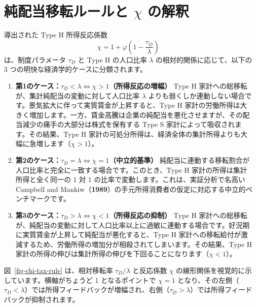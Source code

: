\documentclass[
  japanese,
  lualatex,
  ja=standard,
  12pt,
  a4paper]{ltjsarticle}
\providecommand{\tightlist}{%
  \setlength{\itemsep}{0pt}\setlength{\parskip}{0pt}}
\begin{document}

\section{\texorpdfstring{純配当移転ルールと \(\chi\)
の解釈}{純配当移転ルールと \textbackslash chi の解釈}}\label{ux7d14ux914dux5f53ux79fbux8ee2ux30ebux30fcux30ebux3068-chi-ux306eux89e3ux91c8}

導出された Type H 所得反応係数 \[
\chi = 1 + \varphi\left( 1 - \frac{\tau_D}{\lambda} \right)
\] は、制度パラメータ \(\tau_D\) と Type H の人口比率 \(\lambda\)
の相対的関係に応じて、以下の 3 つの明快な経済学的ケースに分類されます。

\begin{enumerate}
\def\labelenumi{\arabic{enumi}.}
\tightlist
\item
  \textbf{第1のケース：\(\tau_D < \lambda \iff \chi > 1\)（所得反応の増幅）}
  Type H 家計への総移転が、集計純配当の変動に対して人口比率 \(\lambda\)
  よりも弱くしか連動しない場合です。景気拡大に伴って実質賃金が上昇すると、Type
  H
  家計の労働所得は大きく増加します。一方、賃金高騰は企業の純配当を悪化させますが、その配当減少の痛手の大部分は株式を保有する
  Type S 家計によって吸収されます。その結果、Type H
  家計の可処分所得は、経済全体の集計所得よりも大幅に急増します（\(\chi > 1\)）。
\item
  \textbf{第2のケース：\(\tau_D = \lambda \iff \chi = 1\)（中立的基準）}
  純配当に連動する移転割合が人口比率と完全に一致する場合です。このとき、Type
  H 家計の所得は集計所得と全く同一の 1 対 1
  の比率で変動します。これは、実証分析で名高い Campbell and
  Mankiw（\textbf{1989}）の手元所得消費者の仮定に対応する中立的ベンチマークです。
\item
  \textbf{第3のケース：\(\tau_D > \lambda \iff \chi < 1\)（所得反応の抑制）}
  Type H
  家計への総移転が、純配当の変動に対して人口比率以上に過敏に連動する場合です。好況期に実質賃金が上昇して純配当が悪化すると、Type
  H
  家計への移転給付が激減するため、労働所得の増加分が相殺されてしまいます。その結果、Type
  H
  家計の所得の伸びは集計所得の伸びを下回ることになります（\(\chi < 1\)）。
\end{enumerate}


図~\ref{fig-chi-tax-rule} は、相対移転率 \(\tau_D/\lambda\) と反応係数
\(\chi\) の線形関係を視覚的に示しています。横軸がちょうど 1
となるポイントで \(\chi=1\)
となり、その左側（\(\tau_D < \lambda\)）では所得フィードバックが増幅され、右側（\(\tau_D > \lambda\)）では所得フィードバックが抑制されます。
\end{document}
